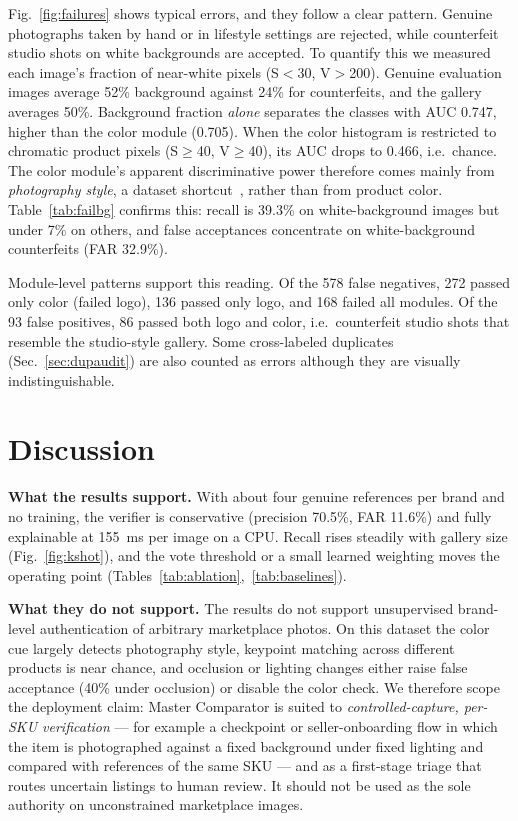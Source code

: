 \documentclass[conference]{IEEEtran}
\begin{document}
Fig.~\ref{fig:failures} shows typical errors, and they follow a clear
pattern. Genuine photographs taken by hand or in lifestyle settings are
rejected, while counterfeit studio shots on white backgrounds are
accepted. To quantify this we measured each image's fraction of
near-white pixels (S$<$30, V$>$200). Genuine evaluation images average
52\% background against 24\% for counterfeits, and the gallery averages
50\%. Background fraction \emph{alone} separates the classes with AUC
0.747, higher than the color module (0.705). When the color histogram
is restricted to chromatic product pixels (S$\geq$40, V$\geq$40), its AUC
drops to 0.466, i.e.\ chance. The color module's apparent
discriminative power therefore comes mainly from \emph{photography
style}, a dataset shortcut~\cite{geirhos2020}, rather than from product
color. Table~\ref{tab:failbg} confirms this: recall is 39.3\% on
white-background images but under 7\% on others, and false acceptances
concentrate on white-background counterfeits (FAR 32.9\%).

Module-level patterns support this reading. Of the 578 false negatives,
272 passed only color (failed logo), 136 passed only logo, and 168 failed
all modules. Of the 93 false positives, 86 passed both logo and color,
i.e.\ counterfeit studio shots that resemble the studio-style gallery.
Some cross-labeled duplicates (Sec.~\ref{sec:dupaudit}) are also
counted as errors although they are visually indistinguishable.

\section{Discussion}
\label{sec:discussion}

\textbf{What the results support.} With about four genuine references per
brand and no training, the verifier is conservative (precision 70.5\%,
FAR 11.6\%) and fully explainable at 155~ms per image on a CPU. Recall
rises steadily with gallery size (Fig.~\ref{fig:kshot}), and the vote
threshold or a small learned weighting moves the operating point
(Tables~\ref{tab:ablation},~\ref{tab:baselines}).

\textbf{What they do not support.} The results do not support
unsupervised brand-level authentication of arbitrary marketplace photos.
On this dataset the color cue largely detects photography style, keypoint
matching across different products is near chance, and occlusion or
lighting changes either raise false acceptance (40\% under occlusion) or
disable the color check. We therefore scope the deployment claim: Master
Comparator is suited to \emph{controlled-capture, per-SKU verification}
--- for example a checkpoint or seller-onboarding flow in which the item
is photographed against a fixed background under fixed lighting and
compared with references of the same SKU --- and as a first-stage triage
that routes uncertain listings to human review. It should not be used as
the sole authority on unconstrained marketplace images.
\end{document}
